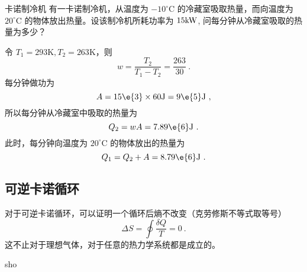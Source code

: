 \begin{example}{卡诺制冷机}
有一卡诺制冷机，从温度为 $-10^{\circ} \mathrm{C}$ 的冷藏室吸取热量，而向温度为 $20^{\circ} \mathrm{C}$ 的物体放出热量。设该制冷机所耗功率为 $15\rm kW$, 问每分钟从冷藏室吸取的热量为多少？

令 $T_1 = 293 \mathrm K , T_2 = 263 \mathrm K $，则
\begin{equation}
w=\frac{T_{2}}{T_{1}-T_{2}}=\frac{263}{30}~.
\end{equation}
每分钟做功为
\begin{equation}
A=15\e{3} \times 60 \mathrm{J}=9\e{5} \mathrm{J}~,
\end{equation}
所以每分钟从冷藏室中吸取的热量为
\begin{equation}
Q_{2}=w A=7.89\e{6} \mathrm{J}~.
\end{equation}
此时，每分钟向温度为 $20^{\circ} \mathrm{C}$ 的物体放出的热量为
\begin{equation}
Q_{1}=Q_{2}+A=8.79\e{6} \mathrm{J}~.
\end{equation}

\end{example}
\subsection{可逆卡诺循环}
对于可逆卡诺循环，可以证明一个循环后熵不改变（克劳修斯不等式取等号）
\begin{equation}
\Delta S = \oint \frac{\delta Q}{T}=0~.
\end{equation} %
这不止对于理想气体，对于任意的热力学系统都是成立的。

sho